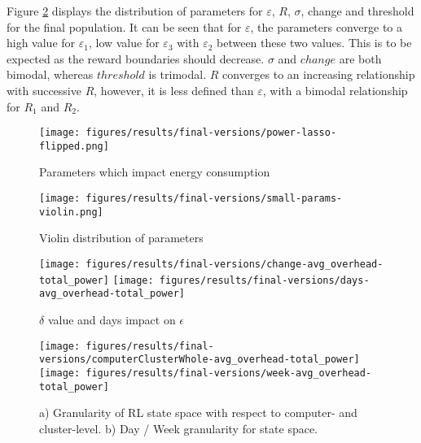 \documentclass[10pt, conference, compsocconf]{IEEEtran}
\begin{document}
Figure \ref{fig:violin-parameters} displays the distribution of parameters for $\varepsilon$, $R$, $\sigma$, change and threshold for the final population. It can be seen that for $\varepsilon$, the parameters converge to a high value for $\varepsilon_1$, low value for $\varepsilon_3$ with $\varepsilon_2$ between these two values. This is to be expected as the reward boundaries should decrease. $\sigma$ and $change$ are both bimodal, whereas $threshold$ is trimodal. $R$ converges to an increasing relationship with successive $R$, however, it is less defined than $\varepsilon$, with a bimodal relationship for $R_1$ and $R_2$.
\begin{figure}[t]%
\texttt{[image: figures/results/final-versions/power-lasso-flipped.png]}%
\vskip -12pt
\caption{Parameters which impact energy consumption}
\label{fig:impact-energy}
\end{figure}
\begin{figure}[!t] 
\vskip -7pt 
\centering
\texttt{[image: figures/results/final-versions/small-params-violin.png]}%
\vskip -12pt
\caption{Violin distribution of parameters}
\label{fig:violin-parameters}
\end{figure}
\begin{figure}[t]%
\vskip -8pt
%
 \texttt{[image: figures/results/final-versions/change-avg\_overhead-total\_power]}%
\hfil%
\texttt{[image: figures/results/final-versions/days-avg\_overhead-total\_power]}%
%
\vskip -12pt
\caption{$\delta$ value and days impact on $\epsilon$}
\label{fig:changes}
\vskip -12pt
\end{figure}
\begin{figure}[!t]
  \texttt{[image: figures/results/final-versions/computerClusterWhole-avg\_overhead-total\_power]}
  \texttt{[image: figures/results/final-versions/week-avg\_overhead-total\_power]}
  \vskip -10pt
  \caption{a) Granularity of RL state space with respect to computer- and cluster-level. b) Day / Week granularity for state space.}
  \label{fig:granularity}
  \vskip -14pt
\end{figure}
\end{document}
